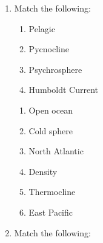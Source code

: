 \documentclass[journal,12pt,onecolumn,fleqn]{IEEEtran}
\theoremstyle{remark}
\theoremstyle{remark}
\begin{document}
\begin{enumerate}[label=Q.\arabic*.]
    \item Match the following: \hfill{} \\
    
\begin{multicols}{2}
            \begin{enumerate}[label=(\Alph*),start=16]
                \item Pelagic
                \item Pycnocline
                \item Psychrosphere
                \item Humboldt Current
            \end{enumerate}
            
            \columnbreak
            
            

            \begin{enumerate}[label=\arabic*.]
                \item Open ocean
                \item Cold sphere
                \item North Atlantic
                \item Density
                \item Thermocline
                \item East Pacific
            \end{enumerate}            

        \end{multicols}
            \begin {enumerate}
            \end{enumerate}
\item Match the following: \hfill{} \\
    

\end{enumerate}
\end{document}

